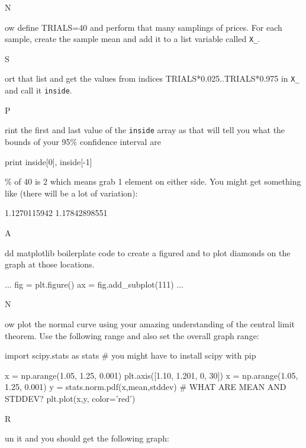\documentclass[titlepage]{tufte-book}
\newcounter{problem}
\newcommand{\step}[1]{{}
\vspace{4pt} \noindent {\bf \theproblem. }#1\addtocounter{problem}{1}}
\begin{document}
\begin{fullwidth}
\step Now define TRIALS=40 and perform that many samplings of prices. For each sample, create the sample mean and add it to a list variable called {\tt X\_}.

\step Sort that list and get the values from indices TRIALS*0.025..TRIALS*0.975 in {\tt X\_} and call it {\tt inside}.

\step Print the first and last value of the {\tt inside} array as that will tell you what the bounds of your 95\% confidence interval are

\begin{pyverbatim}
print inside[0], inside[-1]
\end{pyverbatim}

\% of 40 is 2 which means grab 1 element on either side. You might get something like (there will be a lot of variation):

1.1270115942 1.17842898551

\step Add matplotlib boilerplate code to create a figured and to plot diamonds on the graph at those locations.

\begin{pyverbatim}
...
fig = plt.figure()
ax = fig.add_subplot(111)
...
\end{pyverbatim}


\step Now plot the normal curve using your amazing understanding of the central limit  theorem. Use the following range and also set the overall graph range:

\begin{pyverbatim}
import scipy.stats as stats # you might have to install scipy with pip

x = np.arange(1.05, 1.25, 0.001)
plt.axis([1.10, 1.201, 0, 30])
x = np.arange(1.05, 1.25, 0.001)
y = stats.norm.pdf(x,mean,stddev)  # WHAT ARE MEAN AND STDDEV?
plt.plot(x,y, color='red')
\end{pyverbatim}

\step Run it and you should get the following graph:



\end{fullwidth}
\end{document}
